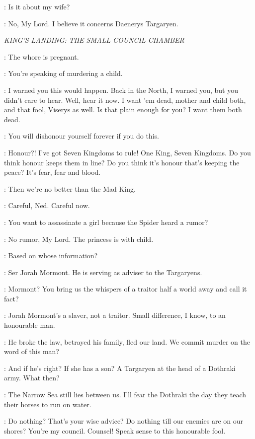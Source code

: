 \NED: Is it about my wife? 

\STEWARD: No, My Lord. I believe it concerns Daenerys Targaryen. 


\scene

\textit{KING'S LANDING: THE SMALL COUNCIL CHAMBER} 


\ROBERT: The whore is pregnant. 

\NED: You're speaking of murdering a child. 

\ROBERT: I warned you this would happen. Back in the North, I warned you, but you didn't care to hear. Well, hear it now. I want 'em dead, mother and child both, and that fool, Viserys as well. Is that plain enough for you? I want them both dead. 

\NED: You will dishonour yourself forever if you do this. 

\ROBERT: Honour?! I've got Seven Kingdoms to rule! One King, Seven
Kingdoms. Do you think honour keeps them in line? Do you think it's
honour that's keeping the peace? It's fear, fear and blood. 

\NED: Then we're no better than the Mad King. 

\ROBERT: Careful, Ned. Careful now. 

\NED: You want to assassinate a girl because the Spider heard a rumor? 

\VARYS: No rumor, My Lord. The princess is with child. 

\NED: Based on whose information? 

\VARYS: Ser Jorah Mormont. He is serving as adviser to the Targaryens. 

\NED: Mormont? You bring us the whispers of a traitor half a world away and call it fact? 

\LITTLEFINGER: Jorah Mormont's a slaver, not a traitor. Small difference, I know, to an honourable man. 

\NED: He broke the law, betrayed his family, fled our land. We commit murder on the word of this man? 

\ROBERT: And if he's right? If she has a son? A Targaryen at the head of a Dothraki army. What then? 

\NED: The Narrow Sea still lies between us. I'll fear the Dothraki the day they teach their horses to run on water. 

\ROBERT: Do nothing? That's your wise advice? Do nothing till our enemies are on our shores? You're my council. Counsel! Speak sense to this honourable fool. 

